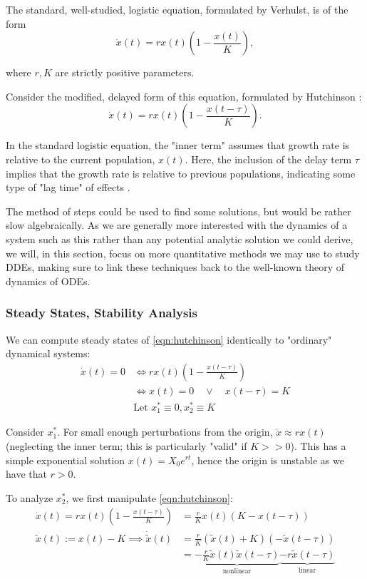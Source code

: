 \documentclass[12pt]{article}
\begin{document}
The standard, well-studied, logistic equation, formulated by Verhulst, is of the form \begin{equation}
    \dot{x}(t)= rx(t)\left(1 - \frac{x(t)}{K}\right),
\end{equation}

where $r, K$ are strictly positive parameters. 

Consider the modified, delayed form of this equation, formulated by Hutchinson \cite{Hutchinson}:
\begin{equation}\label{eqn:hutchinson}
    \dot{x}(t) = rx(t)\left(1 - \frac{x(t - \tau)}{K}\right).
\end{equation}

In the standard logistic equation, the "inner term" assumes that growth rate is relative to the current population, $x(t)$. Here, the inclusion of the delay term $\tau$ implies that the growth rate is relative to previous populations, indicating some type of "lag time" of effects \cite{ddesinglespecies}.

The method of steps could be used to find some solutions, but would be rather slow algebraically. As we are generally more interested with the dynamics of a system such as this rather than any potential analytic solution we could derive, we will, in this section, focus on more quantitative methods we may use to study DDEs, making sure to link these techniques back to the well-known theory of dynamics of ODEs.

\subsubsection{Steady States, Stability Analysis}

We can compute steady states of \cref{eqn:hutchinson} identically to "ordinary" dynamical systems:
\begin{align*}
    \dot{x}(t) = 0 &\iff rx(t)\left(1 - \frac{x(t - \tau)}{K}\right)\\
    &\iff x(t) = 0 \quad \vee \quad x(t - \tau) = K\\
    &\text{Let } x^*_1 \equiv 0, x^*_2 \equiv K
\end{align*}

Consider $x^*_1$. For small enough perturbations from the origin, $\dot{x} \approx rx(t)$ (neglecting the inner term; this is particularly "valid" if $K >> 0$). This has a simple exponential solution $x(t) = X_0 e^{rt}$, hence the origin is unstable as we have that $r >0$.

To analyze $x^*_2$, we first manipulate \cref{eqn:hutchinson}:
\begin{align*}
    \dot{x}(t) = rx(t)\left(1 - \frac{x(t - \tau)}{K}\right) &= \frac{r}{K}x(t)\left(K - x(t - \tau)\right)\\
    \tilde{x}(t) := x(t) - K \implies \dot{\tilde{x}}(t) &= \frac{r}{K}(\tilde{x}(t) + K)(-\tilde{x}(t - \tau))\\
    &= \underbrace{-\frac{r}{K}\tilde{x}(t)\tilde{x}(t - \tau)}_{\text{nonlinear}} \underbrace{- r \tilde{x}(t - \tau)}_{\text{linear}}
\end{align*}
\end{document}
